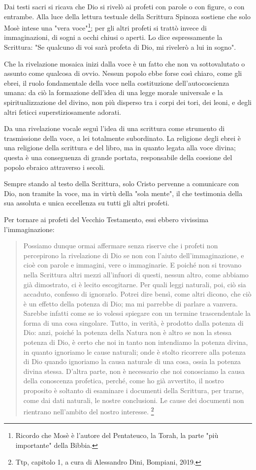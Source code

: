 Dai testi sacri si ricava che Dio si rivelò ai profeti con parole o con figure, o con entrambe. Alla luce della lettura testuale della Scrittura
Spinoza sostiene che solo Mosè intese una "vera voce"\footnote{Ricordo che Mosè è l'autore del Pentateuco, la Torah, la parte "più importante" della Bibbia.}; per gli altri profeti  si trattò invece di immaginazioni, di sogni a occhi chiusi o aperti. Lo dice espressamente
la Scrittura: "Se qualcuno di voi sarà profeta di Dio, mi rivelerò a lui in sogno". 

Che la rivelazione mosaica inizi dalla voce è un fatto che non va sottovalutato o assunto come
qualcosa di ovvio. Nessun popolo ebbe forse così chiaro, come gli ebrei, il ruolo
fondamentale della voce nella costituzione dell'autocoscienza umana: da ciò la formazione dell'idea di una legge morale universale e la spiritualizzazione
del divino, non più disperso tra i corpi dei tori, dei leoni, e degli altri feticci
superstiziosamente adorati.

Da una rivelazione vocale seguì l'idea di una scrittura come
strumento di trasmissione della voce, a lei totalmente subordinato. La religione degli ebrei è una
religione della scrittura e del libro, ma in quanto legata alla voce divina; questa è una conseguenza di grande portata, responsabile
della coesione del popolo ebraico attraverso i secoli.

Sempre stando al testo della Scrittura, solo Cristo pervenne a
comunicare con Dio, non tramite la voce, ma in virtù della "sola mente", il che
testimonia della sua assoluta e unica eccellenza su tutti gli altri profeti.

Per tornare ai profeti del Vecchio Testamento, essi ebbero vivissima l'immaginazione:

\begin{quotation}
	\small Possiamo dunque ormai affermare senza riserve che i profeti non percepirono la rivelazione di Dio
	se non con l'aiuto dell'immaginazione, e cioè con parole e immagini, vere o immaginarie. E poiché
	non si trovano nella Scrittura altri mezzi all'infuori di questi, nessun altro, come abbiamo già
	dimostrato, ci è lecito escogitarne. Per quali leggi naturali, poi, ciò sia accaduto, confesso di
	ignorarlo. Potrei dire bensì, come altri dicono, che ciò è un effetto della potenza di Dio; ma mi
	parrebbe di parlare a vanvera. Sarebbe infatti come se io volessi spiegare con un termine
	trascendentale la forma di una cosa singolare. Tutto, in verità, è prodotto dalla potenza di Dio: anzi,
	poiché la potenza della Natura non è altro se non la stessa potenza di Dio, è certo che noi in tanto non intendiamo la potenza divina, in quanto ignoriamo le cause naturali; onde è stolto ricorrere
	alla potenza di Dio quando ignoriamo la causa naturale di una cosa, ossia la potenza divina stessa.
	D'altra parte, non è necessario che noi conosciamo la causa della conoscenza profetica, perché,
	come ho già avvertito, il nostro proposito è soltanto di esaminare i documenti della Scrittura, per
	trarne, come dai dati naturali, le nostre conclusioni. Le cause dei documenti non rientrano
	nell'ambito del nostro interesse. \footnote{Ttp, capitolo 1, a cura di Alessandro Dini, Bompiani, 2019.}
\end{quotation}

